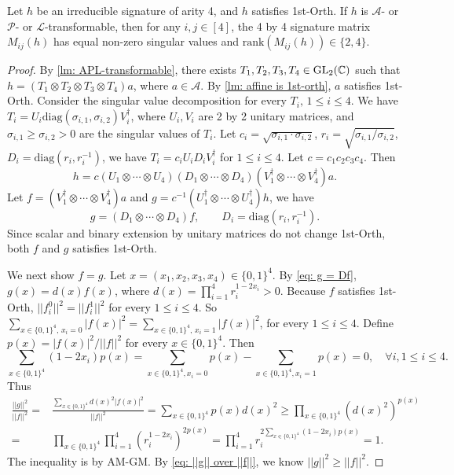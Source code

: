 \begin{lemma}\label{lm: APL-transformable singular value}
    Let $h$ be an irreducible signature of arity 4, and $h$ satisfies {\sc 1st-Orth}.
    If $h$ is $\mathscr{A}$- or $\mathscr{P}$- or $\mathscr{L}$-transformable, then for any $i,j\in[4]$, the 4 by 4 signature matrix $M_{ij}(h)$ has equal non-zero singular values and $\mathrm{rank}(M_{ij}(h))\in \{2,4\}.$
\end{lemma}
\begin{proof}
    By \cref{lm: APL-transformable}, there exists $T_1,T_2,T_3,T_4\in \mathrm{GL}_2(\mathbb{C})$ such that $h=(T_1\otimes T_2 \otimes T_3 \otimes T_4)a$, where $a\in \mathscr{A}.$
    By \cref{lm: affine is 1st-orth}, $a$ satisfies {\sc 1st-Orth}.
    Consider the singular value decomposition for every $T_i, \,1\le i\le 4$.
    We have $T_i=U_i\mathrm{diag}(\sigma_{i,1},\sigma_{i,2})V_i^\dagger$, where $U_i,V_i$ are 2 by 2 unitary matrices, and $\sigma_{i,1}\ge\sigma_{i,2}>0$ are the singular values of $T_i.$
    Let $c_i=\sqrt{\sigma_{i,1}\cdot \sigma_{i,2}}$, $r_i=\sqrt{\sigma_{i,1}/\sigma_{i,2}}$, $D_i=\mathrm{diag}(r_i,r_i^{-1})$, we have $T_i=c_iU_i D_i V_i^\dagger$ for $1\le i\le 4.$
    Let $c=c_1c_2c_3c_4$. 
    Then
    $$
    h=c(U_1\otimes \cdots \otimes U_4)(D_1\otimes \cdots \otimes D_4)(V_1^\dagger \otimes \cdots \otimes V_4^\dagger)a.
    $$
    Let $f=(V_1^\dagger\otimes \cdots\otimes V_4^\dagger)a$ and $g=c^{-1}(U_1^\dagger\otimes \cdots \otimes U_4^\dagger)h$, we have
    \begin{equation}\label{eq: g = Df}
        g=(D_1\otimes \cdots \otimes D_4)f,\qquad D_i=\mathrm{diag}(r_i,r_i^{-1}).
    \end{equation}
    Since scalar and binary extension by unitary matrices do not change {\sc 1st-Orth}, both $f$ and $g$ satisfies {\sc 1st-Orth}.
    
    We next show $f=g$.
    Let $x=(x_1,x_2,x_3,x_4)\in \{0,1\}^{4}.$
    By \eqref{eq: g = Df}, $g(x)=d(x)f(x)$, where $d(x)=\prod_{i=1}^4r_i^{1-2x_i}>0$.
    Because $f$ satisfies {\sc 1st-Orth}, $||f_i^0||^2=||f_i^1||^2$ for every $1\le i\le 4$.
    So $\sum_{x\in\{0,1\}^4,\,x_i=0}|f(x)|^2=\sum_{x\in\{0,1\}^4,\,x_i=1}|f(x)|^2$, for every $1\le i\le 4.$
    Define $p(x)=|f(x)|^2/||f||^2$ for every $x\in\{0,1\}^4.$
    Then 
    $$
    \sum_{x\in\{0,1\}^4}(1-2x_i)p(x)=\sum_{x\in\{0,1\}^4,x_i=0}p(x)-\sum_{x\in\{0,1\}^4,x_i=1}p(x)=0,\quad \forall i, 1\le i\le 4.
    $$
    Thus
    \begin{equation}\label{eq: ||g|| over ||f||}
        \begin{aligned}
            \frac{||g||^2}{||f||^2}=&\frac{\sum_{x\in\{0,1\}^4}d(x)^2|f(x)|^2}{||f||^2}
            =\sum_{x\in\{0,1\}^4}p(x)d(x)^2\ge \prod_{x\in\{0,1\}^4}(d(x)^2)^{p(x)}\\
            =&\prod_{x\in\{0,1\}^4}\prod_{i=1}^4(r_i^{1-2x_i})^{2p(x)}
            =\prod_{i=1}^4r_i^{2\sum_{x\in\{0,1\}^4}(1-2x_i)p(x)}=1.
        \end{aligned}
    \end{equation}
    The inequality is by AM-GM.
    By \eqref{eq: ||g|| over ||f||}, we know $||g||^2\ge ||f||^2.$


\end{proof}
